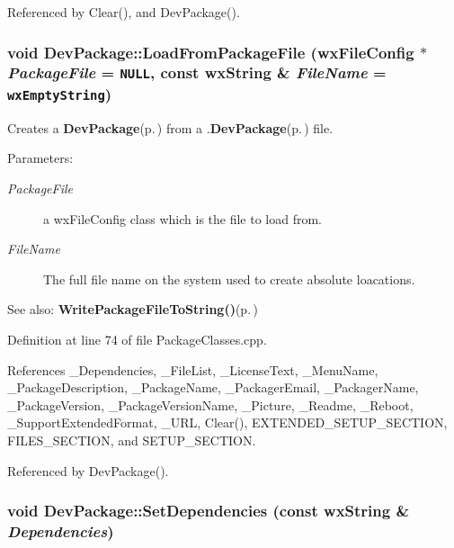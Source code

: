 Referenced by Clear(), and Dev\-Package().
\subsubsection{\setlength{\rightskip}{0pt plus 5cm}void Dev\-Package::Load\-From\-Package\-File (wx\-File\-Config $\ast$ {\em Package\-File} = {\tt NULL}, const wx\-String \& {\em File\-Name} = {\tt wxEmptyString})}\label{class_dev_package_5d4c41739aab3852483a0be0f01c9a93}


Creates a {\bf Dev\-Package}{\rm (p.\,\pageref{class_dev_package})} from a .{\bf Dev\-Package}{\rm (p.\,\pageref{class_dev_package})} file. \begin{Desc}
\item[Parameters:]
\begin{description}
\item[{\em Package\-File}]a wx\-File\-Config class which is the file to load from. \item[{\em File\-Name}]The full file name on the system used to create absolute loacations. \end{description}
\end{Desc}
\begin{Desc}
\item[See also:]{\bf Write\-Package\-File\-To\-String()}{\rm (p.\,\pageref{class_dev_package_582087a094b37723a308a80610a94c5a})} \end{Desc}


Definition at line 74 of file Package\-Classes.cpp.

References \_\-Dependencies, \_\-File\-List, \_\-License\-Text, \_\-Menu\-Name, \_\-Package\-Description, \_\-Package\-Name, \_\-Packager\-Email, \_\-Packager\-Name, \_\-Package\-Version, \_\-Package\-Version\-Name, \_\-Picture, \_\-Readme, \_\-Reboot, \_\-Support\-Extended\-Format, \_\-URL, Clear(), EXTENDED\_\-SETUP\_\-SECTION, FILES\_\-SECTION, and SETUP\_\-SECTION.

Referenced by Dev\-Package().
\subsubsection{\setlength{\rightskip}{0pt plus 5cm}void Dev\-Package::Set\-Dependencies (const wx\-String \& {\em Dependencies})\hspace{0.3cm}{\tt  [inline]}}\label{class_dev_package_91c618d016b6f988c2e10adef07e6f3f}



